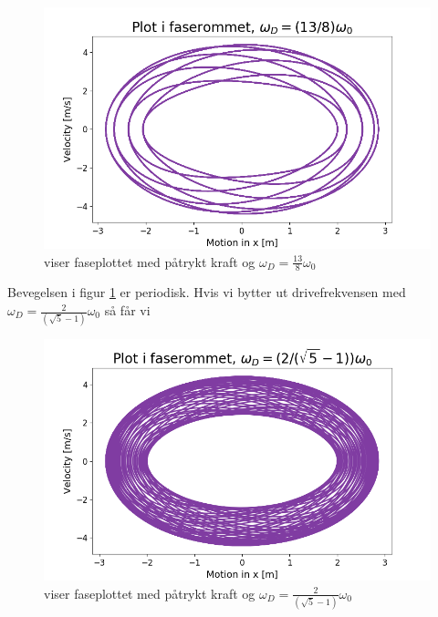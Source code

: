 \documentclass[norsk,a4paper,12pt]{article}
\begin{document}
\begin{figure}[h]
\begin{center}
\includegraphics[scale=0.5]{Oppgave4fasedel1.png}
\caption{viser faseplottet med påtrykt kraft og $\omega_D = \frac{13}{8}\omega_0$}
\label{fig:faseplot4del1}
\end{center}
\end{figure}
Bevegelsen i figur \ref{fig:faseplot4del1} er periodisk. Hvis vi bytter ut drivefrekvensen med $\omega_D = \frac{2}{\left(\sqrt{5}-1 \right)}\omega_0$ så får vi 


\begin{figure}[h]
\begin{center}
\includegraphics[scale=0.5]{Oppgave4fasedel2.png}
\caption{viser faseplottet med påtrykt kraft og $\omega_D = \frac{2}{\left(\sqrt{5}-1 \right)}\omega_0$}
\label{fig:faseplot4del2}
\end{center}
\end{figure}
\end{document}
